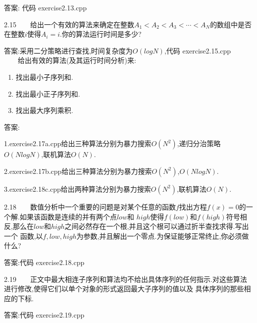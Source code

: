 \documentclass[9pt, a4paper,eqno]{article}
\theoremstyle{plain}
\begin{document}
\begin{CJK}{UTF8}{gkai}
答案: 代码 exercise2.13.cpp

2.15~~~~给出一个有效的算法来确定在整数$A_1 < A_2 < A_3 < \cdots < A_N$的数组中是否在整数$i$使得$A_i = i$.你的算法运行时间是多少?

答案:采用二分策略进行查找,时间复杂度为$O(logN)$,代码 exercise2.15.cpp
~~~~给出有效的算法(及其运行时间分析)来:
\begin{enumerate}
\item 找出最小子序列和.
\item 找出最小正子序列和.
\item 找出最大序列乘积.
\end{enumerate}

答案: 

1.exercise2.17a.cpp给出三种算法分别为暴力搜索$O(N^2)$,递归分治策略$O(NlogN)$,联机算法$O(N)$.

2.exercise2.17b.cpp给出三种算法分别为暴力搜索$O(N^2)$,$O(NlogN)$.

3.exercise2.18c.cpp给出两种算法分别为暴力搜索$O(N^2)$,联机算法$O(N)$.

2.18~~~~数值分析中一个重要的问题是对某个任意的函数$f$找出方程$f(x)=0$的一个解.如果该函数是连续的并有两个点$low$和
$high$使得$f(low)$和$f(high)$符号相反,那么在$low$和$high$之间必然存在一个根,并且这个根可以通过折半查找求得.写出一个
函数,以$f,low,high$为参数,并且解出一个零点.为保证能够正常终止,你必须做什么?

答案:代码 exercise2.18.cpp

2.19~~~~正文中最大相连子序列和算法均不给出具体序列的任何指示.对这些算法进行修改,使得它们以单个对象的形式返回最大子序列的值以及
具体序列的那些相应的下标.

答案:代码 exercise2.19.cpp



















\end{CJK}
\end{document}
